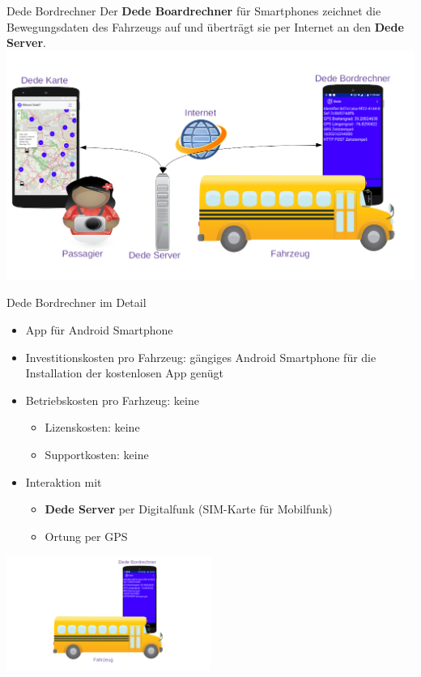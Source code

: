 
\begin{frame}{Dede Bordrechner}
  Der \textbf{Dede Boardrechner} für Smartphones zeichnet die Bewegungsdaten des Fahrzeugs auf und überträgt sie per Internet an den \textbf{Dede Server}.
  \includegraphics[width=\paperwidth]{dede/dede-concept}
\end{frame}

\begin{frame}{Dede Bordrechner im Detail}
  \begin{itemize}
  \item App für Android Smartphone
  \item Investitionskosten pro Fahrzeug: gängiges Android Smartphone für die Installation der kostenlosen App genügt
  \item Betriebskosten pro Farhzeug: keine
    \begin{itemize}
    \item Lizenskosten: keine
    \item Supportkosten: keine
    \end{itemize}
  \item Interaktion mit
    \begin{itemize}
    \item \textbf{Dede Server} per Digitalfunk (SIM-Karte für Mobilfunk)
    \item Ortung per GPS
    \end{itemize}
  \end{itemize}
  \includegraphics[width=0.5\textwidth]{dede/dede-on-board-computer-june-04.png}
\end{frame}

